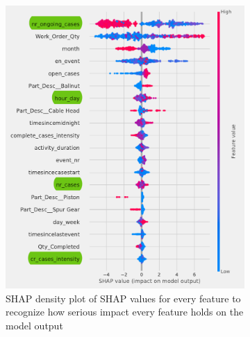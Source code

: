 \begin{figure}[!htbp] %
	\caption[SHAP density plot product]{SHAP density plot of}
	\label{fig:shap1}
	\begin{subfigure}{0.48\textwidth}
		\includegraphics[width=\linewidth]{images/shap/summary_plot.pdf}
		\caption[SHAP density plot]{SHAP density plot of SHAP values for every feature to recognize how serious impact every feature holds on the model output}
	 \label{fig:SHAP11}
	\end{subfigure}\hspace*{\fill}
	\begin{subfigure}{0.48\textwidth}

\end{subfigure}
\end{figure}
